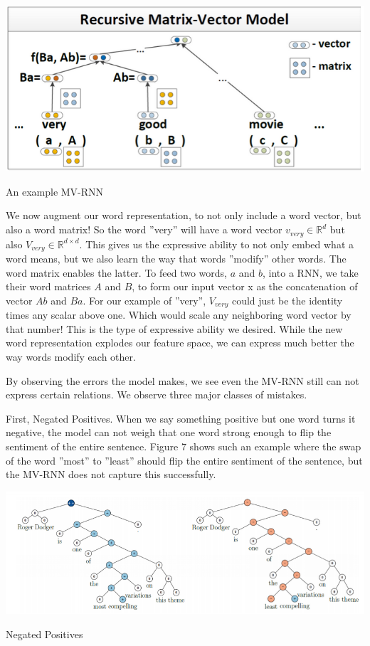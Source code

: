 \documentclass{tufte-handout}
\begin{document}
\begin{marginfigure}%
  \includegraphics[width=\linewidth]{img6}
  \caption{An example MV-RNN}
  \label{fig:img6}
\end{marginfigure}

We now augment our word representation, to not only include a word vector, but also a word matrix! So the word ''very'' will have a word vector  $v_{very} \in \mathbb{R}^{d}$ but also $V_{very} \in \mathbb{R}^{d\times d}$. This gives us the expressive ability to not only embed what a word means, but we also learn the way that words ''modify'' other words. The word matrix enables the latter. To feed two words, $a$ and $b$, into a RNN, we take their word matrices $A$ and $B$, to form our input vector x as the concatenation of vector $Ab$ and $Ba$. For our example of ''very'', $V_{very}$ could just be the identity times any scalar above one. Which would scale any neighboring word vector by that number! This is the type of expressive ability we desired. While the new word representation explodes our feature space, we can express much better the way words modify each other.

By observing the errors the model makes, we see even the MV-RNN still can not express certain relations. We observe three major classes of mistakes. 

First, Negated Positives. When we say something positive but one word turns it negative, the model can not weigh that one word strong enough to flip the sentiment of the entire sentence. Figure 7 shows such an example where the swap of the word ''most'' to ''least'' should flip the entire sentiment of the sentence, but the MV-RNN does not capture this successfully.



\begin{marginfigure}%
  \includegraphics[width=\linewidth]{img7}
  \caption{Negated Positives}
  \label{fig:img7}
\end{marginfigure}
\end{document}

